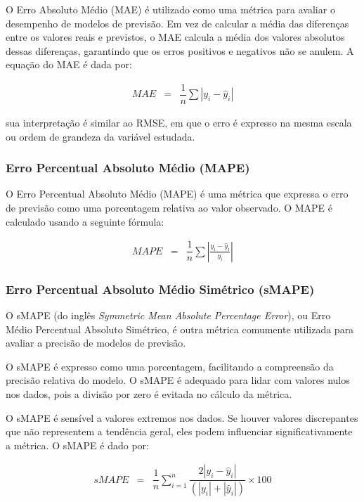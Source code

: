 O Erro Absoluto Médio (MAE) é utilizado como uma métrica para avaliar o desempenho de modelos de previsão. Em vez de calcular a média das diferenças entre os valores reais e previstos, o MAE calcula a média dos valores absolutos dessas diferenças, garantindo que os erros positivos e negativos não se anulem.
A equação do MAE é dada por:

\begin{eqnarray}
	M A E &=& \dfrac{1}{n} \sum\left|y_i-\hat{y}_i\right|\label{eq:mae}
\end{eqnarray}

\noindent sua interpretação é similar ao RMSE, em que o erro é expresso na mesma escala ou ordem de grandeza da variável estudada.

\subsubsection{Erro Percentual Absoluto M\'edio (MAPE)}

O Erro Percentual Absoluto Médio (MAPE) é uma métrica que expressa o erro de previsão como uma porcentagem relativa ao valor observado. 
O MAPE é calculado usando a seguinte fórmula:

\begin{eqnarray}
	MAPE &=& \dfrac{1}{n} \sum\left|\frac{y_i - \hat{y}_i}{y_i}\right|\label{eq:mape}
\end{eqnarray}



\subsubsection{Erro Percentual Absoluto M\'edio Sim\'etrico (sMAPE)}


O sMAPE (do inglês \textit{Symmetric Mean Absolute Percentage Error}), ou Erro Médio Percentual Absoluto Simétrico, é outra métrica comumente utilizada para avaliar a precisão de modelos de previsão. 

O sMAPE é expresso como uma porcentagem, facilitando a compreensão da precisão relativa do modelo.  O sMAPE é adequado para lidar com valores nulos nos dados, pois a divisão por zero é evitada no cálculo da métrica.


O sMAPE é sensível a valores extremos nos dados. Se houver valores discrepantes que não representem a tendência geral, eles podem influenciar significativamente a métrica.	
O sMAPE é dado por:



\begin{eqnarray}
	sMAPE &=& \dfrac{1}{n} \sum_{i=1}^{n} \dfrac{2|y_i - \hat{y}_i|}{(|y_i| + |\hat{y}_i|)} \times 100\label{eq:smape}
\end{eqnarray}





